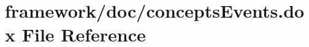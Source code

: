 \hypertarget{concepts_events_8dox}{}\section{framework/doc/concepts\+Events.dox File Reference}
\label{concepts_events_8dox}

